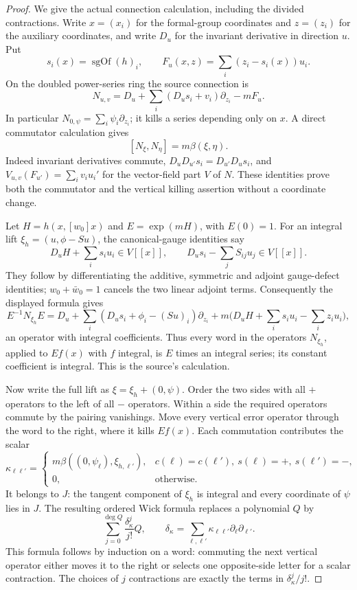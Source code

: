 \begin{proof}
We give the actual connection calculation, including the divided
contractions.  Write \(x=(x_i)\) for the formal-group coordinates and
\(z=(z_i)\) for the auxiliary coordinates, and write \(D_u\) for the
invariant derivative in direction \(u\).  Put
\[
 s_i(x)=\operatorname{sgOf}(h)_i,\qquad
 F_u(x,z)=\sum_i(z_i-s_i(x))u_i .
\]
On the doubled power-series ring the source connection is
\begin{equation}\label{eq:ftb-explicit-connection}
 N_{u,v}=D_u+\sum_i(D_us_i+v_i)\partial_{z_i}-mF_u .
\end{equation}
In particular \(N_{0,\psi}=\sum_i\psi_i\partial_{z_i}\);
it kills a series depending only on \(x\).
A direct commutator calculation gives
\[
 [N_\xi,N_\eta]=m\beta(\xi,\eta).
\]
Indeed invariant derivatives commute,
\(D_uD_{u'}s_i=D_{u'}D_us_i\), and
\(V_{u,v}(F_{u'})=\sum_iv_iu_i'\) for the vector-field part \(V\)
of \(N\).  These identities prove both the commutator and the
vertical killing assertion without a coordinate change.

Let \(H=h(x,[w_0]x)\) and \(E=\exp(mH)\), with \(E(0)=1\).
For an integral lift
\(\xi_h=(u,\phi-Su)\), the canonical-gauge identities say
\[
 D_uH+\sum_is_i u_i\in V[[x]],\qquad
 D_us_i-\sum_jS_{ij}u_j\in V[[x]] .
\]
They follow by differentiating the additive, symmetric and adjoint
gauge-defect identities; \(w_0+\bar w_0=1\) cancels the two linear
adjoint terms.  Consequently the displayed formula gives
\[
 E^{-1}N_{\xi_h}E
  =D_u+\sum_i(D_us_i+\phi_i-(Su)_i)\partial_{z_i}
      +m\bigl(D_uH+\sum_is_i u_i-\sum_iz_i u_i\bigr),
\]
an operator with integral coefficients.
Thus every word in the operators \(N_{\xi_h}\), applied to
\(E f(x)\) with \(f\) integral, is \(E\) times an integral series;
its constant coefficient is integral.
This is the source's  calculation.

Now write the full lift as \(\xi=\xi_h+(0,\psi)\).
Order the two sides with all \(+\) operators to the left of all
\(-\) operators.  Within a side the required operators commute by
the pairing vanishings.  Move every vertical error operator through
the word to the right, where it kills \(E f(x)\).
Each commutation contributes the scalar
\[
 \kappa_{\ell\ell'}
   =\begin{cases}
       m\beta((0,\psi_\ell),\xi_{h,\ell'}),
              &c(\ell)=c(\ell'),\
                 s(\ell)=+,\ s(\ell')=-,\\
       0,&\text{otherwise}.
     \end{cases}
\]
It belongs to \(J\): the tangent component of \(\xi_h\) is integral
and every coordinate of \(\psi\) lies in \(J\).
The resulting ordered Wick formula replaces a polynomial \(Q\) by
\[
       \sum_{j=0}^{\deg Q}
          \frac{\delta_\kappa^j}{j!}Q,\qquad
 \delta_\kappa=\sum_{\ell,\ell'}\kappa_{\ell\ell'}
                         \partial_\ell\partial_{\ell'} .
\]
This formula follows by induction on a word: commuting the next
vertical operator either moves it to the right or selects one
opposite-side letter for a scalar contraction.
The choices of \(j\) contractions are exactly the terms in
\(\delta_\kappa^j/j!\).


\end{proof}
